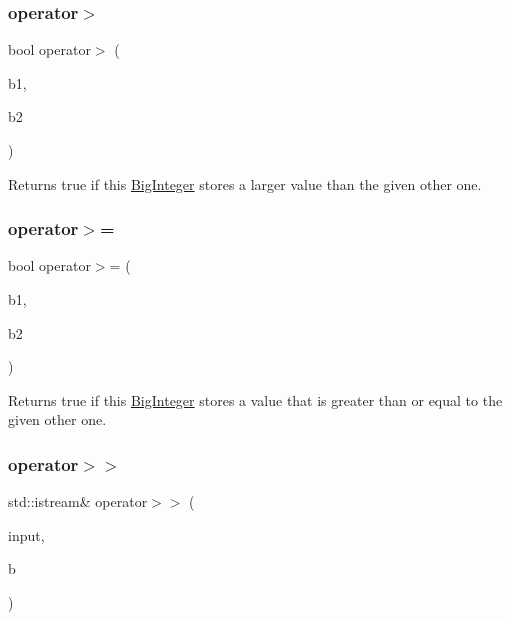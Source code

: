 \subsubsection{\texorpdfstring{operator$>$}{operator>}}
{\footnotesize\ttfamily bool operator$>$ (\begin{DoxyParamCaption}\item[{const \mbox{\hyperlink{classBigInteger}{Big\+Integer}} \&}]{b1,  }\item[{const \mbox{\hyperlink{classBigInteger}{Big\+Integer}} \&}]{b2 }\end{DoxyParamCaption})\hspace{0.3cm}{\ttfamily [friend]}}



Returns true if this \mbox{\hyperlink{classBigInteger}{Big\+Integer}} stores a larger value than the given other one. 

\mbox{\label{classBigInteger_aac387c7e85293502096e25fe753e6490}} 
\subsubsection{\texorpdfstring{operator$>$=}{operator>=}}
{\footnotesize\ttfamily bool operator$>$= (\begin{DoxyParamCaption}\item[{const \mbox{\hyperlink{classBigInteger}{Big\+Integer}} \&}]{b1,  }\item[{const \mbox{\hyperlink{classBigInteger}{Big\+Integer}} \&}]{b2 }\end{DoxyParamCaption})\hspace{0.3cm}{\ttfamily [friend]}}



Returns true if this \mbox{\hyperlink{classBigInteger}{Big\+Integer}} stores a value that is greater than or equal to the given other one. 

\mbox{\label{classBigInteger_ab3c25317df8d1955db53a700f10e6edc}} 
\subsubsection{\texorpdfstring{operator$>$$>$}{operator>>}}
{\footnotesize\ttfamily std\+::istream\& operator$>$$>$ (\begin{DoxyParamCaption}\item[{std\+::istream \&}]{input,  }\item[{\mbox{\hyperlink{classBigInteger}{Big\+Integer}} \&}]{b }\end{DoxyParamCaption})\hspace{0.3cm}{\ttfamily [friend]}}




